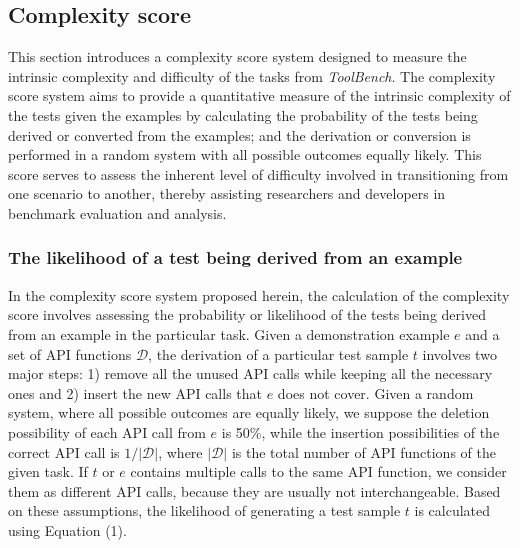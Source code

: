 \subsection{Complexity score}
This section introduces a complexity score system designed to measure the intrinsic complexity and difficulty of the tasks from \textit{ToolBench}. The complexity score system aims to provide a quantitative measure of the intrinsic complexity of the tests given the examples by calculating the probability of the tests being derived or converted from the examples; and the derivation or conversion is performed in a random system with all possible outcomes equally likely. This score serves to assess the inherent level of difficulty involved in transitioning from one scenario to another, thereby assisting researchers and developers in benchmark evaluation and analysis.


\subsubsection{The likelihood of a test being derived from an example}
In the complexity score system proposed herein, the calculation of the complexity score involves assessing the probability or likelihood of the tests being derived from an example in the particular task. Given a demonstration example $e$ and a set of API functions $\mathcal{D}$, the derivation of a particular test sample $t$ involves two major steps: 1) remove all the unused API calls while keeping all the necessary ones and 2) insert the new API calls that $e$ does not cover. Given a random system, where all possible outcomes are equally likely, we suppose the deletion possibility of each API call from $e$ is 50\%, while the insertion possibilities of the correct API call is $1 / |\mathcal{D}|$, where $|\mathcal{D}|$ is the total number of API functions of the given task. If $t$ or $e$ contains multiple calls to the same API function, we consider them as different API calls, because they are usually not interchangeable. Based on these assumptions, the likelihood of generating a test sample $t$ is calculated using Equation (1). 

